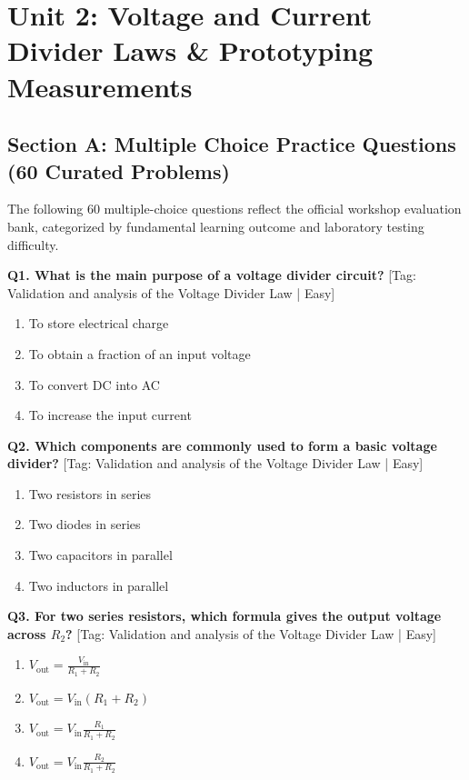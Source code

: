 \chapter{Unit 2: Voltage and Current Divider Laws \& Prototyping Measurements}

\section{Section A: Multiple Choice Practice Questions (60 Curated Problems)}

\noindent The following 60 multiple-choice questions reflect the official workshop evaluation bank, categorized by fundamental learning outcome and laboratory testing difficulty.\vspace{3mm}

\noindent\textbf{Q1. What is the main purpose of a voltage divider circuit?} \hfill [Tag: Validation and analysis of the Voltage Divider Law | Easy]
\begin{enumerate}[label=(\alph*),topsep=2pt,itemsep=1pt,partopsep=0pt,parsep=0pt]
    \item {To store electrical charge}
    \item {To obtain a fraction of an input voltage}
    \item {To convert DC into AC}
    \item {To increase the input current}
\end{enumerate}
\vspace{2mm}

\noindent\textbf{Q2. Which components are commonly used to form a basic voltage divider?} \hfill [Tag: Validation and analysis of the Voltage Divider Law | Easy]
\begin{enumerate}[label=(\alph*),topsep=2pt,itemsep=1pt,partopsep=0pt,parsep=0pt]
    \item {Two resistors in series}
    \item {Two diodes in series}
    \item {Two capacitors in parallel}
    \item {Two inductors in parallel}
\end{enumerate}
\vspace{2mm}

\noindent\textbf{Q3. For two series resistors, which formula gives the output voltage across $R_2$?} \hfill [Tag: Validation and analysis of the Voltage Divider Law | Easy]
\begin{enumerate}[label=(\alph*),topsep=2pt,itemsep=1pt,partopsep=0pt,parsep=0pt]
    \item {$V_{\mathrm{out}} = \frac{V_{\mathrm{in}}}{R_1 + R_2}$}
    \item {$V_{\mathrm{out}} = V_{\mathrm{in}}(R_1 + R_2)$}
    \item {$V_{\mathrm{out}} = V_{\mathrm{in}} \frac{R_1}{R_1 + R_2}$}
    \item {$V_{\mathrm{out}} = V_{\mathrm{in}} \frac{R_2}{R_1 + R_2}$}
\end{enumerate}
\vspace{2mm}

